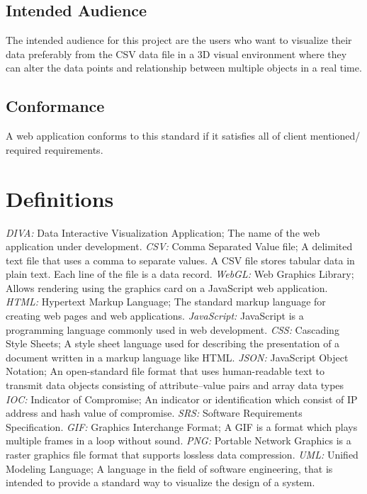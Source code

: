 \documentclass[journal,10pt,onecolumn,compsoc]{IEEEtran} \usepackage[margin=1.0in]{geometry} \usepackage{pdfpages}
\begin{document}
    \subsection{Intended Audience}
    The intended audience for this project are the users who want to visualize their data preferably from the CSV data file in a 3D visual environment where they can alter the data points and relationship between multiple objects in a real time. 
    \subsection{Conformance}
    A web application conforms to this standard if it satisfies all of client mentioned/ required requirements.

\section{Definitions}
    \textit{DIVA: } Data Interactive Visualization Application; The name of the web application under development. 
    \textit{CSV: } Comma Separated Value file; A delimited text file that uses a comma to separate values. A CSV file stores tabular data in plain text. Each line of the file is a data record.
    \textit{WebGL:} Web Graphics Library; Allows rendering using the graphics card on a JavaScript web application.
    \textit{HTML:} Hypertext Markup Language; The standard markup language for creating web pages and web applications.
    \textit {JavaScript: }JavaScript is a programming language commonly used in web development.
    \textit{CSS: }Cascading Style Sheets; A style sheet language used for describing the presentation of a document written in a markup language like HTML.
    \textit{JSON: }JavaScript Object Notation; An open-standard file format that uses human-readable text to transmit data objects consisting of attribute–value pairs and array data types
    \textit{IOC: }Indicator of Compromise; An indicator or identification which consist of IP address and hash value of compromise.
    \textit{SRS: }Software Requirements Specification.
    \textit{GIF: }Graphics Interchange Format; A GIF is a format which plays multiple frames in a loop without sound.
    \textit{PNG: }Portable Network Graphics is a raster graphics file format that supports lossless data compression\cite{PNG}.
    \textit{UML: }Unified Modeling Language; A language in the field of software engineering, that is intended to provide a standard way to visualize the design of a system\cite{UML}. 
    
\end{document}
